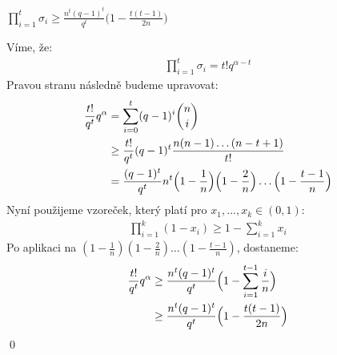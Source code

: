 \lm $\prod\limits_{i = 1}^t \sigma_i \geq \frac{n^t (q-1)^t}{q^t}\bigl(1 - \frac{t(t-1)}{2n}\bigr)$

\dk Víme, že:
\begin{align*}
\prod\limits_{i = 1}^t \sigma_i = t!q^{\alpha-t}
\end{align*}
Pravou stranu následně budeme upravovat:
\begin{align*}
\frac{t!}{q^t}q^\alpha &= \sum\limits_{i = 0}^{t}(q - 1)^i{n \choose i} \\
&\geq \frac{t!}{q^t} (q - 1)^t \frac{n(n-1)\dots(n-t+1)}{t!}  \\
&= \frac{(q-1)^t}{q^t} n^t \Bigl(1 - \frac{1}{n}\Bigr)\Bigl(1 - \frac{2}{n}\Bigr)\dots\Bigl(1 - \frac{t-1}{n}\Bigr)
\end{align*}
Nyní použijeme vzoreček, který platí pro $x_1,\dots,x_k \in (0,1)$:
\begin{align*}
\prod\limits_{i=1}^{k} (1 - x_i) \geq 1 - \sum\limits_{i=1}^{k} x_i
\end{align*}
Po aplikaci na $(1 - \frac{1}{n})(1 - \frac{2}{n})\dots(1 - \frac{t-1}{n})$, dostaneme:
\begin{align*}
\frac{t!}{q^t}q^\alpha &\geq \frac{n^t (q-1)^t}{q^t}\Bigl(1 - \sum\limits_{i=1}^{t-1} \frac{i}{n}\Bigr) \\
&\geq \frac{n^t (q-1)^t}{q^t}\Bigl(1 - \frac{t(t-1)}{2n}\Bigr) 
\end{align*}
\qed




